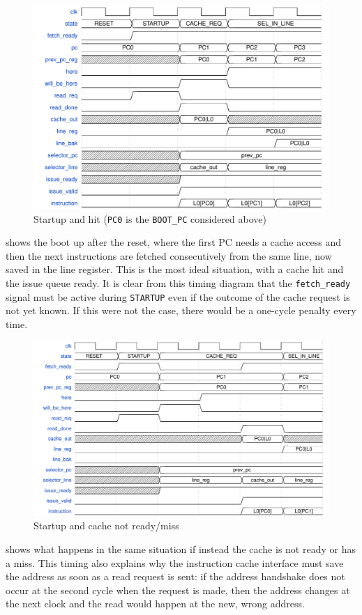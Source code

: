\begin{figure}[hbt]
  \centering
  \includegraphics[scale=.6]{img/fetch01.pdf}
  \caption[Startup and hit]{Startup and hit (\texttt{PC0} is the \texttt{BOOT\_PC} considered above)}
  \label{fig:fetch01}
\end{figure}
 shows the boot up after the reset, where the first \ac{PC} needs a cache access and then the next instructions are fetched consecutively from the same line, now saved in the line register. This is the most ideal situation, with a cache hit and the issue queue ready. It is clear from this timing diagram that the \texttt{fetch\_ready} signal must be active during \texttt{STARTUP} even if the outcome of the cache request is not yet known. If this were not the case, there would be a one-cycle penalty every time.

\begin{figure}[!ht]
  \centering
  \includegraphics[scale=.6]{img/fetch02.pdf}
  \caption{Startup and cache not ready/miss}
  \label{fig:fetch02}
\end{figure}
 shows what happens in the same situation if instead the cache is not ready or has a miss. This timing also explains why the instruction cache interface must save the address as soon as a read request is sent: if the address handshake does not occur at the second cycle when the request is made, then the address changes at the next clock and the read would happen at the new, wrong address.

